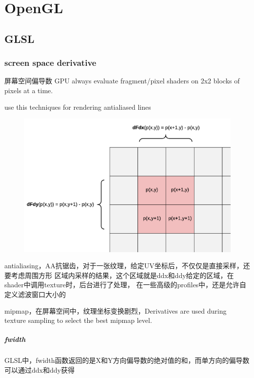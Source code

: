 \chapter{OpenGL}

\section{GLSL}

\subsection{screen space derivative}
屏幕空间偏导数
GPU always evaluate fragment/pixel shaders on 2x2 blocks of pixels at a time.

use this techniques for rendering antialiased lines

\begin{figure}[h]
    \centering
    \includegraphics[width=\textwidth]{images/Shader-Derivatives.png}
\end{figure}

antialiasing，AA抗锯齿，对于一张纹理，给定UV坐标后，不仅仅是直接采样，还要考虑周围方形
区域内采样的结果，这个区域就是ddx和ddy给定的区域，在shader中调用texture时，后台进行了处理，
在一些高级的profiles中，还是允许自定义滤波窗口大小的

mipmap，在屏幕空间中，纹理坐标变换剧烈，Derivatives are used during texture sampling to
select the best mipmap level.

\paragraph{fwidth}
GLSL中，fwidth函数返回的是X和Y方向偏导数的绝对值的和，而单方向的偏导数可以通过ddx和ddy获得

